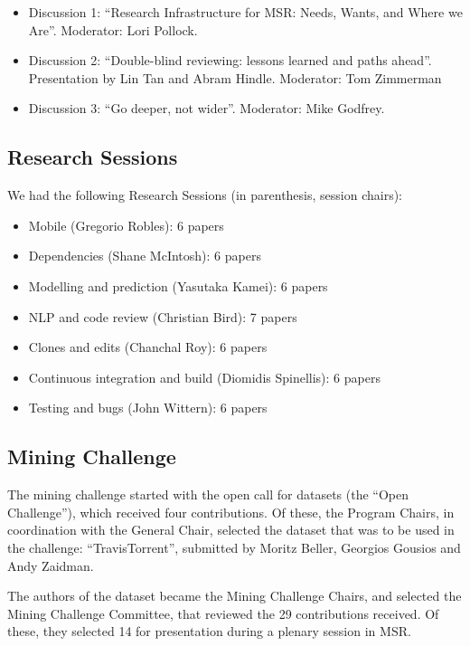 \documentclass[a4paper]{report}
\begin{document}
\begin{itemize}
\item Discussion 1: ``Research Infrastructure for MSR:  Needs, Wants, and Where we Are''. Moderator: Lori Pollock.
\item Discussion 2: ``Double-blind reviewing: lessons learned and paths ahead''. Presentation by Lin Tan and Abram Hindle. Moderator: Tom Zimmerman
\item Discussion 3: ``Go deeper, not wider''. Moderator: Mike Godfrey.
\end{itemize}

\subsection{Research Sessions}

We had the following Research Sessions (in parenthesis, session chairs):

\begin{itemize}
\item Mobile (Gregorio Robles): 6 papers
\item Dependencies (Shane McIntosh): 6 papers
\item Modelling and prediction (Yasutaka Kamei): 6 papers
\item NLP and code review (Christian Bird): 7 papers
\item Clones and edits (Chanchal Roy): 6 papers
\item Continuous integration and build (Diomidis Spinellis): 6 papers
\item Testing and bugs (John Wittern): 6 papers
\end{itemize}

\subsection{Mining Challenge}

The mining challenge started with the open call for datasets (the ``Open Challenge''), which received four contributions. Of these, the Program Chairs, in coordination with the General Chair, selected the dataset that was to be used in the challenge: ``TravisTorrent'', submitted by Moritz Beller, Georgios Gousios and Andy Zaidman.

The authors of the dataset became the Mining Challenge Chairs, and selected the Mining Challenge Committee, that reviewed the 29 contributions received. Of these, they selected 14 for presentation during a plenary session in MSR.
\end{document}
